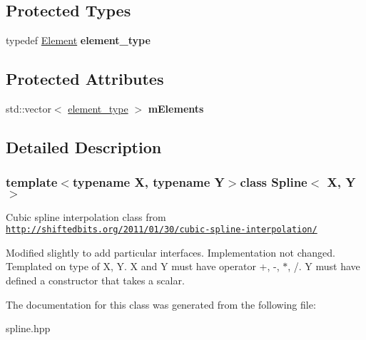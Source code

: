 \subsection*{Protected Types}
\begin{DoxyCompactItemize}
\item 
\hypertarget{classSpline_a0e5f568df00822e6467ad4b6ae6907f1}{typedef \hyperlink{classSpline_1_1Element}{Element} {\bfseries element\-\_\-type}}\label{classSpline_a0e5f568df00822e6467ad4b6ae6907f1}

\end{DoxyCompactItemize}
\subsection*{Protected Attributes}
\begin{DoxyCompactItemize}
\item 
\hypertarget{classSpline_aec12d605758ea834a7de781781de7e95}{std\-::vector$<$ \hyperlink{classSpline_1_1Element}{element\-\_\-type} $>$ {\bfseries m\-Elements}}\label{classSpline_aec12d605758ea834a7de781781de7e95}

\end{DoxyCompactItemize}


\subsection{Detailed Description}
\subsubsection*{template$<$typename X, typename Y$>$class Spline$<$ X, Y $>$}

Cubic spline interpolation class from \href{http://shiftedbits.org/2011/01/30/cubic-spline-interpolation/}{\tt http\-://shiftedbits.\-org/2011/01/30/cubic-\/spline-\/interpolation/}

Modified slightly to add particular interfaces. Implementation not changed. Templated on type of X, Y. X and Y must have operator +, -\/, $\ast$, /. Y must have defined a constructor that takes a scalar. 

The documentation for this class was generated from the following file\-:\begin{DoxyCompactItemize}
\item 
spline.\-hpp\end{DoxyCompactItemize}
